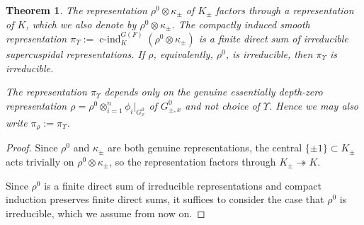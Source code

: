 \documentclass{article}
\DeclareMathOperator{\cind}{c-ind}
\newtheorem{thm}{Theorem}[subsection]
\theoremstyle{definition}
\numberwithin{equation}{subsection}
\renewcommand{\-}{\hyp{}}
\begin{document}
\begin{thm} \label{thm-screps}
	The representation $\rho^0 \otimes \kappa_{\pm}$ of $K_{\pm}$ factors through a representation of $K$, which we also denote by $\rho^0 \otimes \kappa_{\pm}$. The compactly induced smooth representation $\pi_{\Upsilon}:=\cind_K^{G(F)}(\rho^0 \otimes \kappa_{\pm})$ is a finite direct sum of irreducible supercuspidal representations. If $\rho$, equivalently, $\rho^0$, is irreducible, then $\pi_\Upsilon$ is irreducible.
	
	The representation $\pi_{\Upsilon}$ depends only on the genuine essentially depth-zero representation $\rho=\rho^0 \otimes_{i=1}^n \phi_i|_{G^0_x}$ of $G^0_{\pm, x}$ and not choice of $\Upsilon$. Hence we may also write $\pi_\rho:=\pi_{\Upsilon}$.
\end{thm}
\begin{proof}
	Since $\rho^0$ and $\kappa_{\pm}$ are both genuine representations, the central $\{ \pm 1\} \subset K_{\pm}$ acts trivially on $\rho^0 \otimes \kappa_{\pm}$, so the representation factors through $K_{\pm} \twoheadrightarrow K$.
	
	Since $\rho^0$ is a finite direct sum of irreducible representations and compact induction preserves finite direct sums, it suffices to consider the case that $\rho^0$ is irreducible, which we assume from now on.
	

\end{proof}
\end{document}
